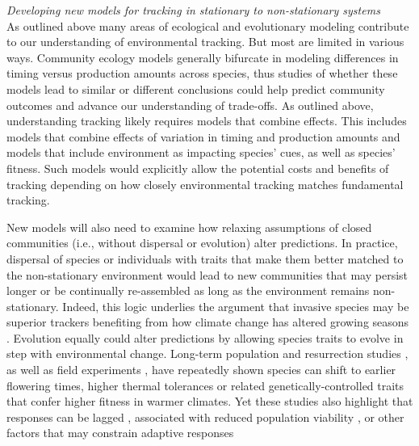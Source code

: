 \documentclass[11pt,letterpaper]{article}
\newcommand{\R}[1]{\label{#1}\linelabel{#1}}
\begin{document}
\emph{Developing new models for tracking in stationary to non-stationary systems} \\ 
As outlined above many areas of ecological and evolutionary modeling contribute to our understanding of environmental tracking. But most are limited in various ways. Community ecology models generally bifurcate in modeling differences in timing versus production amounts across species, thus studies of whether these models lead to similar or different conclusions could help predict community outcomes and advance our understanding of trade-offs. As outlined above, understanding tracking likely requires models that combine effects. This includes models that combine effects of variation in timing and production amounts and models that include environment as impacting species' cues, as well as species' fitness. Such models would explicitly allow the potential costs and benefits of tracking \R{modelcosts3} depending on how closely environmental tracking matches fundamental tracking.

New models will also need to examine how relaxing assumptions of closed communities (i.e., without dispersal or evolution) alter predictions. In practice, dispersal of species or individuals with traits that make them better matched to the non-stationary environment would lead to new communities that may persist longer or be continually re-assembled as long as the environment remains non-stationary. Indeed, this logic underlies the argument that invasive species may be superior trackers benefiting from how climate change has altered growing seasons \citep{Willis:2010al,wolkovich:2010fee}. Evolution equally could alter predictions by allowing species traits to evolve in step with environmental change. Long-term population \citep[e.g.,][]{colautti2017} and resurrection studies \citep{wilczek2014,yousey2018}, as well as field experiments \citep{colautti2017,arab2019}, have repeatedly shown species can shift to earlier flowering times, higher thermal tolerances or related genetically-controlled traits that confer higher fitness in warmer climates. Yet these studies also highlight that responses can be lagged \citep[e.g.,][]{wilczek2014}, associated with reduced population viability \citep[e.g.,][]{colautti2017}, or other factors that may constrain adaptive responses
\end{document}
